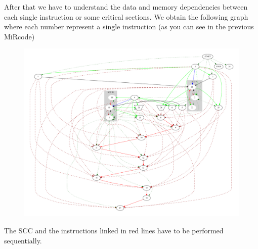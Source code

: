 After that we have to understand the data and memory dependencies between each single instruction or some critical sections.
We obtain the following graph where each number represent a single instruction (as you can see in the previous MiRcode)

\begin{figure}[h!]
	\centering
	\includegraphics[width=\textwidth]{imm/tessa/PDGscc.pdf} 	\caption{
	} 
	\label{pdg}
\end{figure}
The SCC and the instructions linked in red lines have to be performed sequentially.